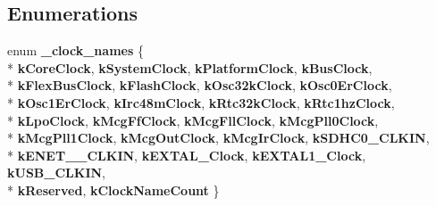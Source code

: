 \subsection*{Enumerations}
\begin{DoxyCompactItemize}
\item 
enum {\bfseries \+\_\+clock\+\_\+names} \{ \\*
{\bfseries k\+Core\+Clock}, 
{\bfseries k\+System\+Clock}, 
{\bfseries k\+Platform\+Clock}, 
{\bfseries k\+Bus\+Clock}, 
\\*
{\bfseries k\+Flex\+Bus\+Clock}, 
{\bfseries k\+Flash\+Clock}, 
{\bfseries k\+Osc32k\+Clock}, 
{\bfseries k\+Osc0\+Er\+Clock}, 
\\*
{\bfseries k\+Osc1\+Er\+Clock}, 
{\bfseries k\+Irc48m\+Clock}, 
{\bfseries k\+Rtc32k\+Clock}, 
{\bfseries k\+Rtc1hz\+Clock}, 
\\*
{\bfseries k\+Lpo\+Clock}, 
{\bfseries k\+Mcg\+Ff\+Clock}, 
{\bfseries k\+Mcg\+Fll\+Clock}, 
{\bfseries k\+Mcg\+Pll0\+Clock}, 
\\*
{\bfseries k\+Mcg\+Pll1\+Clock}, 
{\bfseries k\+Mcg\+Out\+Clock}, 
{\bfseries k\+Mcg\+Ir\+Clock}, 
{\bfseries k\+S\+D\+H\+C0\+\_\+\+C\+L\+K\+IN}, 
\\*
{\bfseries k\+E\+N\+E\+T\+\_\+\_\+\+C\+L\+K\+IN}, 
{\bfseries k\+E\+X\+T\+A\+L\+\_\+\+Clock}, 
{\bfseries k\+E\+X\+T\+A\+L1\+\_\+\+Clock}, 
{\bfseries k\+U\+S\+B\+\_\+\+C\+L\+K\+IN}, 
\\*
{\bfseries k\+Reserved}, 
{\bfseries k\+Clock\+Name\+Count}
 \}\hypertarget{group__sim__hal_ga000db43a9c0cfd7473ebf8e4d6e0853b}{}\label{group__sim__hal_ga000db43a9c0cfd7473ebf8e4d6e0853b}


\end{DoxyCompactItemize}
